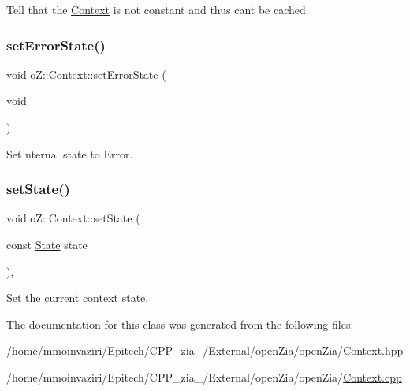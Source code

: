 Tell that the \mbox{\hyperlink{classo_z_1_1_context}{Context}} is not constant and thus can\textquotesingle{}t be cached. 

\mbox{\label{classo_z_1_1_context_a036d993634650ee8414c2f12d49d0204}} 
\subsubsection{\texorpdfstring{setErrorState()}{setErrorState()}}
{\footnotesize\ttfamily void o\+Z\+::\+Context\+::set\+Error\+State (\begin{DoxyParamCaption}\item[{void}]{ }\end{DoxyParamCaption})\hspace{0.3cm}{\ttfamily [inline]}}



Set nternal state to Error. 

\mbox{\label{classo_z_1_1_context_aa71b839188393f2328ad9f9c5da08004}} 
\subsubsection{\texorpdfstring{setState()}{setState()}}
{\footnotesize\ttfamily void o\+Z\+::\+Context\+::set\+State (\begin{DoxyParamCaption}\item[{const \mbox{\hyperlink{namespaceo_z_a356b278f7c65def0cae75fca8cae268e}{State}}}]{state }\end{DoxyParamCaption})\hspace{0.3cm}{\ttfamily [inline]}, {\ttfamily [noexcept]}}



Set the current context\textquotesingle{} state. 



The documentation for this class was generated from the following files\+:\begin{DoxyCompactItemize}
\item 
/home/mmoinvaziri/\+Epitech/\+C\+P\+P\+\_\+zia\+\_/\+External/open\+Zia/open\+Zia/\mbox{\hyperlink{_context_8hpp}{Context.\+hpp}}\item 
/home/mmoinvaziri/\+Epitech/\+C\+P\+P\+\_\+zia\+\_/\+External/open\+Zia/open\+Zia/\mbox{\hyperlink{_context_8cpp}{Context.\+cpp}}\end{DoxyCompactItemize}
